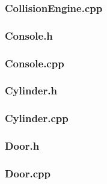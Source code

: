 \documentclass{article}
\begin{document}
\subsubsection{CollisionEngine.cpp}
	
					
\subsubsection{Console.h}
	
					
\subsubsection{Console.cpp}
	
					
\subsubsection{Cylinder.h}
	
					
\subsubsection{Cylinder.cpp}
	
					
\subsubsection{Door.h}
	

\subsubsection{Door.cpp}
	
 				
\end{document}
